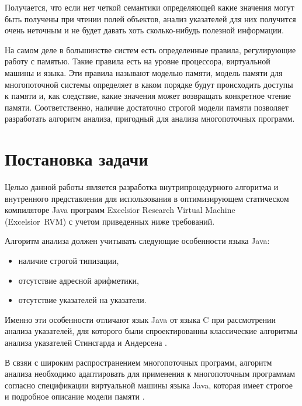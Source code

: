 \documentclass[14pt,titlepage]{extarticle}
\newcommand{\eng}[1]{{\English#1}}
\let\oldsection\section
\renewcommand{\section}{\newpage\oldsection}
\begin{document}
      Получается, что если нет четкой семантики определяющей какие значения
      могут быть получены при чтении полей объектов, анализ указателей для
      них получится очень неточным и не будет давать хоть сколько-нибудь
      полезной информации.

      На самом деле в большинстве систем есть определенные правила,
      регулирующие работу с памятью. Такие правила есть на уровне процессора,
      виртуальной машины и языка. Эти правила называют моделью памяти,
      модель памяти для многопоточной системы определяет в каком
      порядке будут происходить доступы к памяти и, как следствие, какие
      значения может возвращать конкретное чтение памяти. Соответственно,
      наличие достаточно строгой модели памяти позволяет разработать алгоритм
      анализа, пригодный для анализа многопоточных программ.


  \section{Постановка задачи}

    Целью данной работы является разработка внутрипроцедурного алгоритма и
    внутренного представления для использования в оптимизирующем
    статическом компиляторе Java программ
    \eng{Excelsior Research Virtual Machine (Excelsior~RVM)}
    \cite{excelsior_jet} с учетом приведенных ниже требований.

    Алгоритм анализа должен учитывать следующие особенности языка Java:
    \begin{itemize}
      \item наличие строгой типизации,
      \item отсутствие адресной арифметики,
      \item отсутствие указателей на указатели.
    \end{itemize}
    Именно эти особенности отличают язык Java от языка C при рассмотрении
    анализа указателей, для которого были
    спроектированны классические алгоритмы анализа указателей
    Стинсгарда \cite{steensgaard} и Андерсена \cite{andersen}.

    В свзяи с широким распространением многопоточных программ,
    алгоритм анализа необходимо адаптировать для применения к
    многопоточным программам согласно спецификации виртуальной машины языка
    Java, которая имеет строгое и подробное описание модели памяти
    \cite{manson_jmm}.
\end{document}
